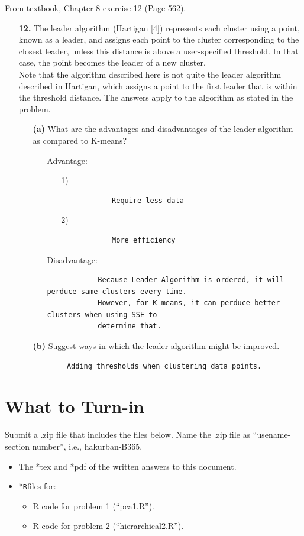 \documentclass{article}
\newcommand{\quotes}[1]{``#1''}
\begin{document}
From textbook, Chapter 8 exercise 12 (Page 562).
\begin{enumerate}
	\item [\textbf{12.}] The leader algorithm (Hartigan [4]) represents each cluster using a point, known as a leader, and assigns each point to the cluster corresponding to the closest leader, unless this distance is above a user-specified threshold. In that case, the point becomes the leader of a new cluster.
	\\
	Note that the algorithm described here is not quite the leader algorithm described in Hartigan, which assigns a point to the first leader that is within the threshold distance. The answers apply to the algorithm as stated in the problem.
	\begin{enumerate}
		\item [\textbf{(a)}] What are the advantages and disadvantages of the leader algorithm as compared to K-means?
		\begin{enumerate}
			\item [Advantage:]
			\begin{enumerate}
			\item[1)] 
			\begin{verbatim}
			Require less data
			\end{verbatim}
			\item[2)] 
			\begin{verbatim}
			More efficiency
			\end{verbatim}
			\end{enumerate}
			\item [Disadvantage:]
			\begin{verbatim}
			Because Leader Algorithm is ordered, it will perduce same clusters every time. 
			However, for K-means, it can perduce better clusters when using SSE to 
			determine that.
			\end{verbatim}
		\end{enumerate}
		\item [\textbf{(b)}] Suggest ways in which the leader algorithm might be improved.
		\begin{verbatim}
		Adding thresholds when clustering data points.
		\end{verbatim}
	\end{enumerate}
\end{enumerate}


\pagebreak
\section*{What to Turn-in}
 Submit a .zip file that includes the files below. Name the .zip  file as \quotes{usename-section number}, i.e., hakurban-B365.


\begin{itemize}
\item The *tex and *pdf of the written answers to this document.
\item *\texttt{R}files for:
\begin{itemize}
\item R code for problem 1 (\quotes{pca1.R}).
\item R code for problem 2 (\quotes{hierarchical2.R}).
\end{itemize}
\end{itemize}
\end{document}

